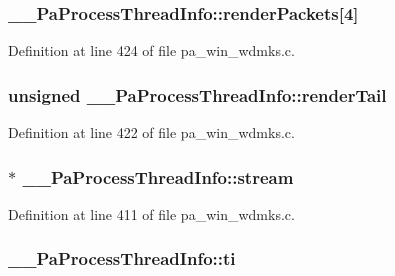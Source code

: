 \subsubsection[{\texorpdfstring{render\+Packets}{renderPackets}}]{ \+\_\+\+\_\+\+Pa\+Process\+Thread\+Info\+::render\+Packets\mbox{[}4\mbox{]}}\hypertarget{struct_____pa_process_thread_info_a174161d8cef2629818fd34a192578992}{}\label{struct_____pa_process_thread_info_a174161d8cef2629818fd34a192578992}


Definition at line 424 of file pa\+\_\+win\+\_\+wdmks.\+c.

\subsubsection[{\texorpdfstring{render\+Tail}{renderTail}}]{\setlength{\rightskip}{0pt plus 5cm}unsigned \+\_\+\+\_\+\+Pa\+Process\+Thread\+Info\+::render\+Tail}\hypertarget{struct_____pa_process_thread_info_a46af18819185c66ad788396981ea7b75}{}\label{struct_____pa_process_thread_info_a46af18819185c66ad788396981ea7b75}


Definition at line 422 of file pa\+\_\+win\+\_\+wdmks.\+c.

\subsubsection[{\texorpdfstring{stream}{stream}}]{$\ast$ \+\_\+\+\_\+\+Pa\+Process\+Thread\+Info\+::stream}\hypertarget{struct_____pa_process_thread_info_a2864554c215847b4fa60f99bbed68323}{}\label{struct_____pa_process_thread_info_a2864554c215847b4fa60f99bbed68323}


Definition at line 411 of file pa\+\_\+win\+\_\+wdmks.\+c.

\subsubsection[{\texorpdfstring{ti}{ti}}]{ \+\_\+\+\_\+\+Pa\+Process\+Thread\+Info\+::ti}\hypertarget{struct_____pa_process_thread_info_a136fb47bcce3eba9d06797ac97109f17}{}\label{struct_____pa_process_thread_info_a136fb47bcce3eba9d06797ac97109f17}


